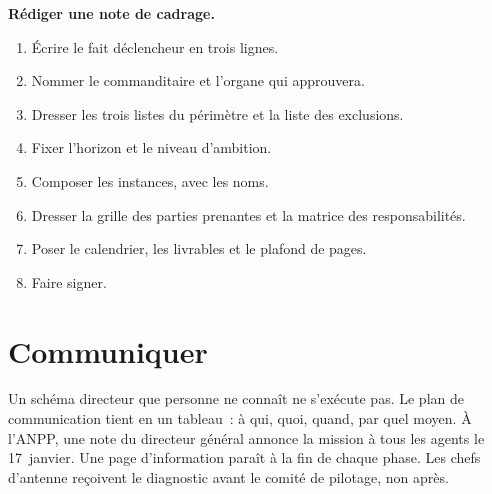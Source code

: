 \begin{boxprocedure}
\textbf{Rédiger une note de cadrage.}
\begin{enumerate}
    \item Écrire le fait déclencheur en trois lignes.
    \item Nommer le commanditaire et l'organe qui approuvera.
    \item Dresser les trois listes du périmètre et la liste des exclusions.
    \item Fixer l'horizon et le niveau d'ambition.
    \item Composer les instances, avec les noms.
    \item Dresser la grille des parties prenantes et la matrice des responsabilités.
    \item Poser le calendrier, les livrables et le plafond de pages.
    \item Faire signer.
\end{enumerate}
\end{boxprocedure}

\section{Communiquer}
\label{sec:c08-communiquer}

Un schéma directeur que personne ne connaît ne s'exécute pas. Le plan de communication tient en un tableau~: à
qui, quoi, quand, par quel moyen. À l'ANPP, une note du directeur général annonce la mission à tous les agents
le 17~janvier. Une page d'information paraît à la fin de chaque phase. Les chefs d'antenne reçoivent le
diagnostic avant le comité de pilotage, non après.

